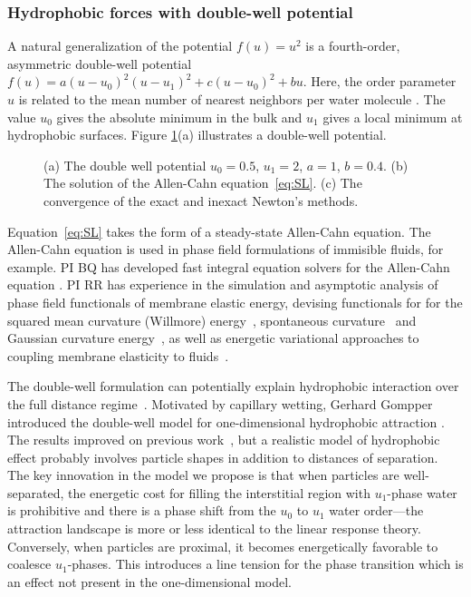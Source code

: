 \subsubsection{Hydrophobic forces with double-well potential}
A natural generalization of the potential $f(u) = u^2$
is a fourth-order, asymmetric double-well potential
$f(u) = a(u-u_0)^2(u-u_1)^2 + c(u-u_0)^2 + bu$.
Here, the order parameter $u$ is related to
the mean number of nearest neighbors
per water molecule \cite{GoHaKo94}.
The value $u_0$ gives the absolute minimum in the bulk
and $u_1$ gives a local minimum at hydrophobic surfaces.
Figure \ref{fig:CA}(a) illustrates a double-well potential.


\begin{figure}
  \vspace{-4pt}
  \centering
   
  \caption{\label{fig:CA} (a) The double well potential $u_0 =
  0.5$, $u_1 = 2$, $a = 1$, $b = 0.4$. (b) The solution of the
  Allen-Cahn equation~\eqref{eq:SL}. (c) The convergence of the exact
  and inexact Newton's methods.}
\end{figure}
Equation~\eqref{eq:SL} takes the form of a steady-state Allen-Cahn
equation. The Allen-Cahn equation is used in phase field formulations of
immisible fluids, for example.
PI BQ has developed fast integral equation solvers for
the Allen-Cahn equation \cite{kro-qua2011, qua2011}.
PI RR has experience in the 
simulation and asymptotic analysis of phase field functionals of
membrane elastic energy, devising functionals for for the squared mean
curvature (Willmore) energy~\cite{0951-7715-18-3-016}, spontaneous
curvature~\cite{Du05} and Gaussian curvature energy~\cite{DuEuler}, as
well as energetic variational approaches to coupling membrane elasticity
to fluids~\cite{QiangDu09}.

The double-well formulation can potentially 
explain hydrophobic interaction over the full distance
regime~\cite{Lum1999, Lin2005, Meyer2006, Ducker2016}.
Motivated by capillary wetting, Gerhard
Gompper introduced the double-well model for one-dimensional
hydrophobic attraction \cite{GoHaKo94}.
The results improved on previous work~\cite{ErLjCl89,MaRa76},
but a realistic model of hydrophobic effect 
probably involves particle shapes in addition to distances of separation.
The key innovation in the model we propose is that when particles are
well-separated, the energetic cost for filling the interstitial region
with $u_1$-phase water is prohibitive and there is a phase shift from
the $u_0$ to $u_1$ water order---the attraction landscape is more or
less identical to the linear response theory. Conversely, when particles
are proximal, it becomes energetically favorable to coalesce
$u_1$-phases. This introduces a line tension for the phase transition
which is an effect not present in the one-dimensional model. 

